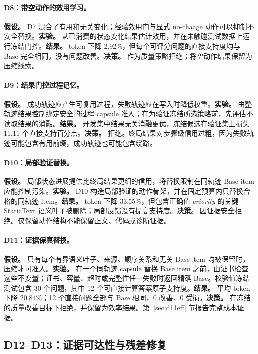 \paragraph{D8：带空动作的效用学习。}
\textbf{假设。} D7 混合了有用和无关变化；经验效用门与显式 no-change 动作可以抑制不安全替换。\textbf{实验。} 从已消费的状态变化结果估计效用，并在未触碰测试数据上运行冻结门控。\textbf{结果。} token 下降 2.92\%，但每个可评分问题的直接支持度均与 Base 完全相同，没有问题改善。\textbf{决策。} 作为质量策略拒绝；将空动作结果保留为压缩线索。

\paragraph{D9：结果门控过程记忆。}
\textbf{假设。} 成功轨迹应产生可复用过程，失败轨迹应在写入时降低权重。\textbf{实验。} 由整轨迹结果控制绑定安全的过程 capsule 准入；在为验证冻结所选策略前，先评估不读取结果的消融。\textbf{结果。} 开发集中结果无关消融更优，冻结候选在验证集上损失 11.11 个直接支持百分点。\textbf{决策。} 拒绝。终局结果对步骤级信用过粗，因为失败轨迹可能包含有用前缀，成功轨迹也可能包含绕路。

\paragraph{D10：局部验证替换。}
\textbf{假设。} 局部状态进展提供比终局结果更细的信用，将替换限制在同轨迹 Base item 应能控制污染。\textbf{实验。} D10 构造局部验证的动作骨架，并在固定预算内只替换合格的同轨迹 item。\textbf{结果。} token 下降 33.55\%，但包含正确值 \emph{priority} 的关键 StaticText 语义叶子被删除；局部反馈没有提高支持度。\textbf{决策。} 因证据安全拒绝。仅保留动作结构不能保留正文、代码或诊断证据。

\paragraph{D11：证据保真替换。}
\textbf{假设。} 只有每个有界语义叶子、来源、顺序关系和无关 Base item 均被保留时，压缩才可准入。\textbf{实验。} 在一个同轨迹 capsule 替换 Base item 之前，由证书检查这些不变量；证书、容量、超时或完整性任一失败时返回精确 Base。校验值冻结测试包含 30 个问题，其中 12 个可直接计算答案原子支持度。\textbf{结果。} 平均 token 下降 20.84\%；12 个直接问题全部与 Base 相同，0 改善、0 受损。\textbf{决策。} 在冻结的质量改善目标下拒绝，并保留为效率结果。第~\ref{sec:d11eff} 节报告完整成本证据。

\subsection{D12--D13：证据可达性与残差修复}

